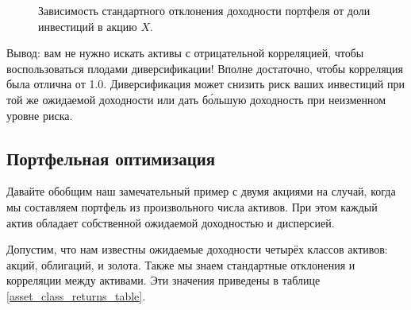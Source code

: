 \begin{figure}[ht]
\centering
{}
\caption{Зависимость стандартного отклонения доходности портфеля от доли 
инвестиций в акцию $X$.}
\label{portfolio_volatility_vs_w}
\end{figure}

Вывод: вам не нужно искать активы с отрицательной корреляцией, чтобы 
воспользоваться плодами диверсификации! Вполне достаточно, чтобы корреляция была 
отлична от 1.0. Диверсификация может снизить риск ваших инвестиций при той же 
ожидаемой доходности или дать б\'{о}льшую доходность при неизменном уровне 
риска.

\subsection{Портфельная оптимизация}

Давайте обобщим наш замечательный пример с двумя акциями на случай, когда мы 
составляем портфель из произвольного числа активов. При этом каждый актив 
обладает собственной ожидаемой доходностью и дисперсией.

Допустим, что нам известны ожидаемые доходности четырёх классов активов: акций, 
облигаций,  и золота. Также мы знаем стандартные отклонения и корреляции между 
активами. Эти значения приведены в таблице \ref{asset_class_returns_table}.

